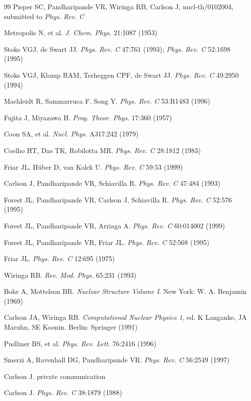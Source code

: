 \begin{thebibliography}{99}
Pieper SC, Pandharipande VR, Wiringa RB, Carlson J,
nucl-th/0102004, submitted to {\it Phys. Rev. C}

Metropolis N, et al.
{\it J. Chem. Phys.} 21:1087 (1953)

Stoks VGJ, de Swart JJ.
{\it Phys. Rev. C} 47:761 (1993);
{\it Phys. Rev. C} 52:1698 (1995)

Stoks VGJ, Klomp RAM, Terheggen CPF, de Swart JJ.
{\it Phys. Rev. C} 49:2950 (1994)

Machleidt R, Sammarruca F, Song Y.
{\it Phys. Rev. C} 53:R1483 (1996)

Fujita J, Miyazawa H.
{\it Prog. Theor. Phys.} 17:360 (1957)

Coon SA, et al.
{\it Nucl. Phys.} A317:242 (1979)

Coelho HT, Das TK, Robilotta MR.
{\it Phys. Rev. C} 28:1812 (1983)

Friar JL, H\"uber D, van Kolck U.
{\it Phys. Rev. C} 59:53 (1999)

Carlson J, Pandharipande VR, Schiavilla R.
{\it Phys. Rev. C} 47:484 (1993)

Forest JL, Pandharipande VR, Carlson J, Schiavilla R.
{\it Phys. Rev. C} 52:576 (1995)

Forest JL, Pandharipande VR, Arriaga A. 
{\it Phys. Rev. C} 60:014002 (1999)

Forest JL, Pandharipande VR, Friar JL.
{\it Phys. Rev. C} 52:568 (1995)

Friar JL.
{\it Phys. Rev. C} 12:695 (1975)

Wiringa RB.
{\it Rev. Mod. Phys.} 65:231 (1993)

Bohr A, Mottelson BR.
{\em Nuclear Structure Volume I}.
New York: W. A. Benjamin (1969)

Carlson JA, Wiringa RB.
{\em Computational Nuclear Physics 1},
ed. K Langanke, JA Maruhn, SE Koonin.
Berlin: Springer (1991)

Pudliner BS, et al.
{\it Phys. Rev. Lett.} 76:2416 (1996)

Smerzi A, Ravenhall DG, Pandharipande VR.
{\it Phys. Rev. C} 56:2549 (1997)

Carlson J. private communication

Carlson J.
{\it Phys. Rev. C} 38:1879 (1988)


\end{thebibliography}
